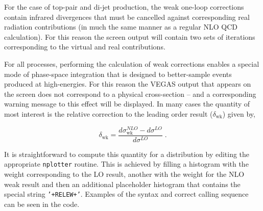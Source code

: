 For the case of top-pair and di-jet production, the weak one-loop corrections contain
infrared divergences that must be cancelled against corresponding real radiation
contributions (in much the same manner as a regular NLO QCD calculation).  For this
reason the screen output will contain two sets of iterations corresponding to the
virtual and real contributions.

For all processes, performing the calculation of weak
corrections enables a special mode of phase-space integration that is designed to
better-sample events produced at high-energies.  For this reason the VEGAS output that
appears on the screen does not correspond to a physical cross-section -- and a corresponding
warning message to this effect will be displayed.  In many cases the quantity of most interest
is the relative correction to the leading order result ($\delta_\mathrm{wk}$) given by,

\begin{equation}
\delta_\mathrm{wk} = \frac{d\sigma_\mathrm{wk}^{NLO} - d\sigma^{LO}}{d\sigma^{LO}} \;.
\end{equation}

It is straightforward to compute this quantity for a distribution by editing the appropriate
{\tt nplotter} routine.  This is achieved by filling a histogram with the weight corresponding
to the LO result, another with the weight for the NLO weak result and then an additional placeholder
histogram that contains the special string {\tt '+RELEW+'}.  Examples of the syntax and correct calling
sequence can be seen in the code.


% 
% 
% 


